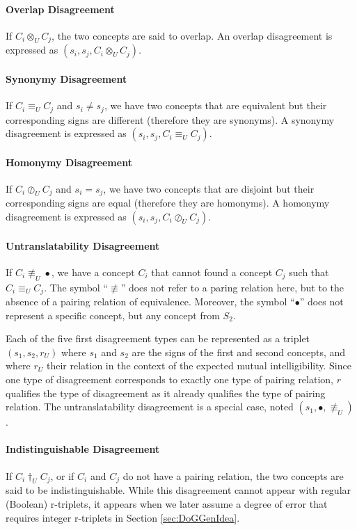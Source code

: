 \paragraph{Overlap Disagreement} If $C_{i} \otimes_{U} C_{j}$, the two concepts are said to overlap. An overlap disagreement is expressed as $(s_{i},s_{j},C_{i} \otimes_{U} C_{j})$.

\paragraph{Synonymy Disagreement} If $C_{i} \equiv_{U} C_{j}$ and $s_{i} \neq s_{j}$, we have two concepts that are equivalent but their corresponding signs are different (therefore they are synonyms). A synonymy disagreement is expressed as $(s_{i},s_{j},C_{i} \equiv_{U} C_{j})$.

\paragraph{Homonymy Disagreement} If $C_{i} \oslash_{U} C_{j}$ and $s_{i} = s_{j}$,  we have two concepts that are disjoint  but their corresponding signs are equal (therefore they are homonyms). A homonymy disagreement is expressed as $(s_{i}, s_{j},C_{i} \oslash_{U} C_{j})$.

\paragraph{Untranslatability Disagreement} If $C_{i} \not \equiv_{U} \bullet$, we have a concept $C_{i}$ that cannot found a concept $C_{j}$ such that $C_{i} \equiv_{U} C_{j}$. The symbol ``$\not \equiv$'' does not refer to a paring relation here, but to the absence of a pairing relation of equivalence. Moreover, the symbol ``$\bullet$'' does not represent a specific concept, but any concept from $S_{2}$.

Each of the five first disagreement types can be represented as a triplet $(s_{1}, s_{2}, r_{U})$ where $s_{1}$ and $s_{2}$ are the signs of the first and second concepts, and where $r_{U}$ their relation in the context of the expected mutual intelligibility. Since one type of disagreement corresponds to exactly one type of pairing relation, $r$ qualifies the type of disagreement as it already qualifies the type of pairing relation. The untranslatability disagreement is a special case, noted $(s_{1}, \bullet, \not \equiv_{U})$.

\paragraph{Indistinguishable Disagreement} If $C_{i} \dagger_{U} C_{j}$, or if $C_{i}$ and $C_{j}$ do not have a pairing relation, the two concepts are said to be indistinguishable. While this disagreement cannot appear with regular (Boolean) r-triplets, it appears when we later assume a degree of error that requires integer r-triplets in Section \ref{sec:DoGGenIdea}.

